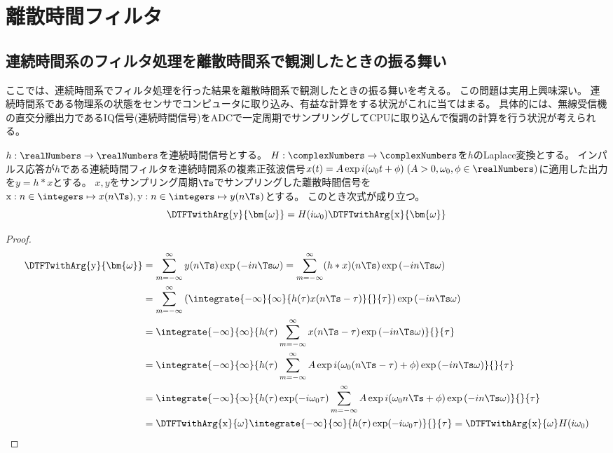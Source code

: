 \chapter{離散時間フィルタ}
    \section{連続時間系のフィルタ処理を離散時間系で観測したときの振る舞い}
        ここでは、連続時間系でフィルタ処理を行った結果を離散時間系で観測したときの振る舞いを考える。
        この問題は実用上興味深い。
        連続時間系である物理系の状態をセンサでコンピュータに取り込み、有益な計算をする状況がこれに当てはまる。
        具体的には、無線受信機の直交分離出力であるIQ信号(連続時間信号)をADCで一定周期でサンプリングしてCPUに取り込んで復調の計算を行う状況が考えられる。
        \begin{shadebox}
            $h:\realNumbers\to\realNumbers$を連続時間信号とする。
            $H:\complexNumbers\to\complexNumbers$を$h$のLaplace変換とする。
            インパルス応答が$h$である連続時間フィルタを連続時間系の複素正弦波信号$x(t) = A\exp i(\omega_0 t + \phi)\;(A>0,\omega_0,\phi\in\realNumbers)$に適用した出力を$y=h*x$とする。
            $x,y$をサンプリング周期$\Ts$でサンプリングした離散時間信号を$\mathrm{x}: n\in\integers\mapsto x(n\Ts), \mathrm{y}: n\in\integers\mapsto y(n\Ts)$とする。
            このとき次式が成り立つ。
            \[ \DTFTwithArg{\mathrm{y}}{\bm{\omega}} = H(i\omega_0)\DTFTwithArg{\mathrm{x}}{\bm{\omega}} \]
        \end{shadebox}
        \begin{proof}
            \begin{align*}
                \DTFTwithArg{\mathrm{y}}{\bm{\omega}} &= \sum_{m=-\infty}^\infty y(n\Ts)\exp \left(-i n\Ts\omega\right) = \sum_{m=-\infty}^\infty (h*x)(n\Ts)\exp \left(-i n\Ts\omega\right) \\
                &= \sum_{m=-\infty}^\infty \left(\integrate{-\infty}{\infty}{h(\tau)x(n\Ts-\tau)}{}{\tau}\right)\exp \left(-i n\Ts\omega\right) \\
                &= \integrate{-\infty}{\infty}{h(\tau)\sum_{m=-\infty}^\infty x(n\Ts-\tau)\exp \left(-i n\Ts\omega\right)}{}{\tau} \\
                &= \integrate{-\infty}{\infty}{h(\tau)\sum_{m=-\infty}^\infty A\exp i(\omega_0 (n\Ts-\tau) + \phi)\exp \left(-i n\Ts\omega\right)}{}{\tau} \\
                &= \integrate{-\infty}{\infty}{h(\tau) \exp(-i\omega_0\tau)\sum_{m=-\infty}^\infty A\exp i(\omega_0 n\Ts + \phi)\exp \left(-i n\Ts\omega\right)}{}{\tau} \\
                &= \DTFTwithArg{\mathrm{x}}{\omega} \integrate{-\infty}{\infty}{h(\tau) \exp(-i\omega_0\tau)}{}{\tau} = \DTFTwithArg{\mathrm{x}}{\omega}H(i\omega_0)
            \end{align*}
        \end{proof}

